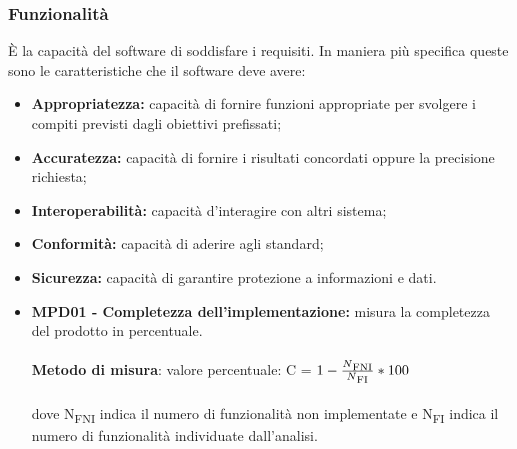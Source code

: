 \subsubsection{Funzionalità}
È la capacità del software di soddisfare i requisiti. In maniera più specifica queste sono le caratteristiche che il software deve avere:
\begin{itemize}
    \item \textbf{Appropriatezza:} capacità di fornire funzioni appropriate per svolgere i compiti previsti dagli obiettivi prefissati;
    \item \textbf{Accuratezza:} capacità di fornire i risultati concordati oppure la precisione richiesta;
    \item \textbf{Interoperabilità:} capacità  d'interagire con altri sistema;
    \item \textbf{Conformità:} capacità di aderire agli standard;
    \item \textbf{Sicurezza:} capacità di garantire protezione a informazioni e dati.
\end{itemize}
\begin{itemize}
    \item \textbf{MPD01 - Completezza dell'implementazione:} misura la completezza del prodotto in percentuale.\\
          \\\textbf{Metodo di misura}: valore percentuale: C = $1-\frac{N\textsubscript{FNI}}{N\textsubscript{FI}}*100$ \\
          \\dove N\textsubscript{FNI} indica il numero di funzionalità non implementate e N\textsubscript{FI} indica il numero di funzionalità
          individuate dall'analisi.
\end{itemize}
